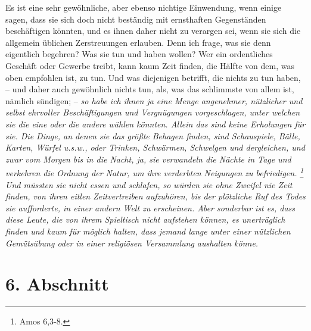 \medskip

Es ist eine sehr gewöhnliche, aber ebenso nichtige Einwendung, wenn einige
sagen, dass sie sich doch nicht beständig mit ernsthaften Gegenständen
beschäftigen könnten, und es ihnen daher nicht zu verargen sei, wenn sie sich
die allgemein üblichen Zerstreuungen erlauben. Denn ich frage, was sie denn
eigentlich begehren? Was sie tun und haben wollen? Wer ein ordentliches
Geschäft oder Gewerbe treibt, kann kaum Zeit finden, die Hälfte von dem, was
oben empfohlen ist, zu tun. Und was diejenigen betrifft, die nichts zu tun
haben, -- und daher auch gewöhnlich nichts tun, als, was das schlimmste von
allem ist, nämlich sündigen; -- \textit{so habe ich ihnen ja eine Menge angenehmer,
nützlicher und selbst ehrvoller Beschäftigungen und Vergnügungen
vorgeschlagen, unter welchen sie die eine oder die andere wählen könnten. Allein das
sind keine Erholungen für sie. Die Dinge, an denen sie das größte Behagen
finden, sind Schauspiele, Bälle, Karten, Würfel u.s.w., oder Trinken,
Schwärmen, Schwelgen und dergleichen, und zwar vom Morgen bis in die Nacht, ja,
sie verwandeln die Nächte in Tage und verkehren die Ordnung der Natur, um ihre
verderbten Neigungen zu befriedigen.
\footnote{Amos 6,3-8.}
Und müssten sie nicht
essen und schlafen, so würden sie ohne Zweifel nie Zeit finden, von ihren eitlen
Zeitvertreiben aufzuhören, bis der plötzliche Ruf des Todes sie aufforderte, in
einer andern Welt zu erscheinen. Aber sonderbar ist es, dass diese Leute, die von
ihrem Spieltisch nicht aufstehen können, es unerträglich finden und kaum für
möglich halten, dass jemand lange unter einer nützlichen Gemütsübung oder in
einer religiösen Versammlung aushalten könne.}

\section{6. Abschnitt} \label{kap15_ab6}

